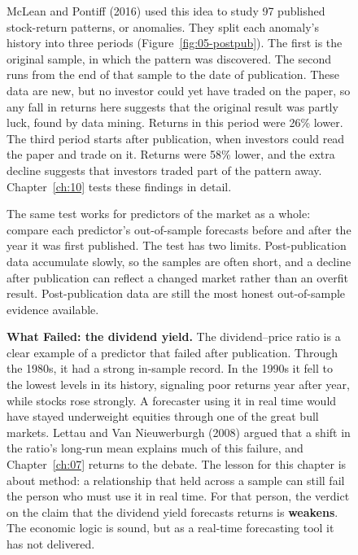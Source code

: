 \begin{figure}[htbp]
McLean and Pontiff (2016) used this idea to study 97 published stock-return patterns, or anomalies. They split each anomaly's history into three periods (Figure~\ref{fig:05-postpub}). The first is the original sample, in which the pattern was discovered. The second runs from the end of that sample to the date of publication. These data are new, but no investor could yet have traded on the paper, so any fall in returns here suggests that the original result was partly luck, found by data mining. Returns in this period were 26\% lower. The third period starts after publication, when investors could read the paper and trade on it. Returns were 58\% lower, and the extra decline suggests that investors traded part of the pattern away. Chapter~\ref{ch:10} tests these findings in detail.


The same test works for predictors of the market as a whole: compare each predictor's out-of-sample forecasts before and after the year it was first published. The test has two limits. Post-publication data accumulate slowly, so the samples are often short, and a decline after publication can reflect a changed market rather than an overfit result. Post-publication data are still the most honest out-of-sample evidence available.

\begin{callout}
\textbf{What Failed: the dividend yield.} The dividend--price ratio is a clear example of a predictor that failed after publication. Through the 1980s, it had a strong in-sample record. In the 1990s it fell to the lowest levels in its history, signaling poor returns year after year, while stocks rose strongly. A forecaster using it in real time would have stayed underweight equities through one of the great bull markets. Lettau and Van Nieuwerburgh (2008) argued that a shift in the ratio's long-run mean explains much of this failure, and Chapter~\ref{ch:07} returns to the debate. The lesson for this chapter is about method: a relationship that held across a sample can still fail the person who must use it in real time. For that person, the verdict on the claim that the dividend yield forecasts returns is \textbf{weakens}. The economic logic is sound, but as a real-time forecasting tool it has not delivered.
\end{callout}


\begin{figure}[htbp]
  \centering
\end{figure}
\end{figure}
